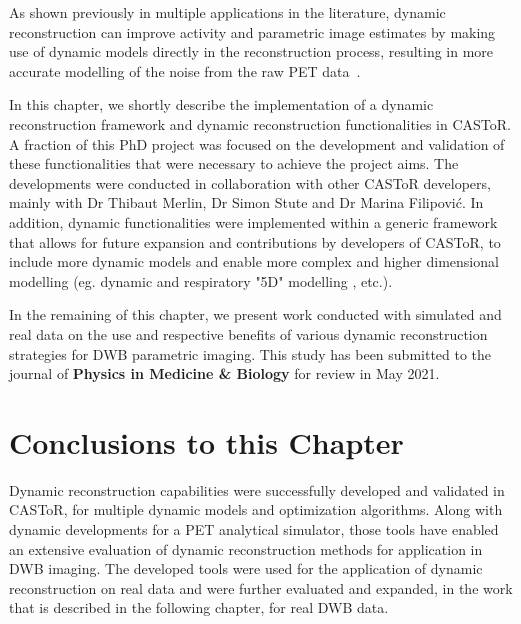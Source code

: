 As shown previously in multiple applications in the literature, dynamic reconstruction can improve activity and parametric image estimates by making use of dynamic models directly in the reconstruction process, resulting in more accurate modelling of the noise from the raw PET data~\cite{Reader2014}. 

In this chapter, we shortly describe the implementation of a dynamic reconstruction framework and dynamic reconstruction functionalities in CASToR. A fraction of this PhD project was focused on the development and validation of these functionalities that were necessary to achieve the project aims. The developments were conducted in collaboration with other CASToR developers, mainly with Dr Thibaut Merlin, Dr Simon Stute and Dr Marina Filipović.
In addition, dynamic functionalities were implemented within a generic framework that allows for future expansion and contributions by developers of CASToR, to include more dynamic models and enable more complex and higher dimensional modelling (eg. dynamic and respiratory "5D" modelling , etc.).

In the remaining of this chapter, we present work conducted with simulated and real data on the use and respective benefits of various dynamic reconstruction strategies for DWB parametric imaging. This study has been submitted to the journal of \textbf{Physics in Medicine \& Biology} for review in May 2021. 



\section{Conclusions to this Chapter}
Dynamic reconstruction capabilities were successfully developed and validated in CASToR, for multiple dynamic models and optimization algorithms. Along with dynamic developments for a PET analytical simulator, those tools have enabled an extensive evaluation of dynamic reconstruction methods for application in DWB imaging. The developed tools were used for the application of dynamic reconstruction on real data and were further evaluated and expanded, in the work that is described in the following chapter, for real DWB data.